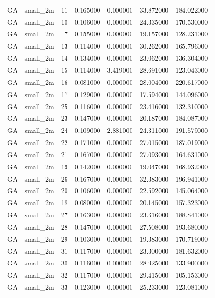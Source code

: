 \begin{tabular}{llrrrrr}
GA & small_2m & 11 & 0.165000 & 0.000000 & 33.872000 & 184.022000 \\
GA & small_2m & 10 & 0.106000 & 0.000000 & 24.335000 & 170.530000 \\
GA & small_2m & 7 & 0.155000 & 0.000000 & 19.157000 & 128.231000 \\
GA & small_2m & 13 & 0.114000 & 0.000000 & 30.262000 & 165.796000 \\
GA & small_2m & 14 & 0.134000 & 0.000000 & 23.062000 & 136.304000 \\
GA & small_2m & 15 & 0.114000 & 3.419000 & 28.691000 & 123.043000 \\
GA & small_2m & 16 & 0.081000 & 0.000000 & 28.004000 & 220.617000 \\
GA & small_2m & 17 & 0.129000 & 0.000000 & 17.594000 & 144.096000 \\
GA & small_2m & 25 & 0.116000 & 0.000000 & 23.416000 & 132.310000 \\
GA & small_2m & 23 & 0.147000 & 0.000000 & 20.187000 & 184.087000 \\
GA & small_2m & 24 & 0.109000 & 2.881000 & 24.311000 & 191.579000 \\
GA & small_2m & 22 & 0.171000 & 0.000000 & 27.015000 & 187.019000 \\
GA & small_2m & 21 & 0.167000 & 0.000000 & 27.093000 & 164.631000 \\
GA & small_2m & 19 & 0.142000 & 0.000000 & 19.047000 & 168.932000 \\
GA & small_2m & 26 & 0.167000 & 0.000000 & 32.383000 & 196.941000 \\
GA & small_2m & 20 & 0.106000 & 0.000000 & 22.592000 & 145.064000 \\
GA & small_2m & 18 & 0.080000 & 0.000000 & 20.145000 & 157.323000 \\
GA & small_2m & 27 & 0.163000 & 0.000000 & 23.616000 & 188.841000 \\
GA & small_2m & 28 & 0.147000 & 0.000000 & 27.508000 & 193.680000 \\
GA & small_2m & 29 & 0.103000 & 0.000000 & 19.383000 & 170.719000 \\
GA & small_2m & 31 & 0.117000 & 0.000000 & 23.300000 & 181.632000 \\
GA & small_2m & 30 & 0.116000 & 0.000000 & 28.925000 & 133.900000 \\
GA & small_2m & 32 & 0.117000 & 0.000000 & 29.415000 & 105.153000 \\
GA & small_2m & 33 & 0.123000 & 0.000000 & 25.233000 & 123.081000 \\

\end{tabular}
